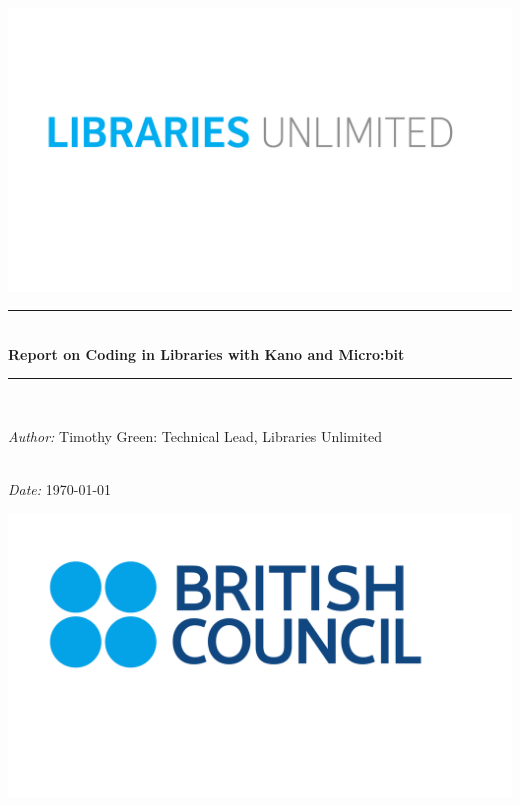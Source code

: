 \documentclass[12pt]{report} %
\begin{document}

\begin{titlepage}

\newcommand{\HRule}{\rule{\linewidth}{0.5mm}} %


\center %

\includegraphics[width=0.7\linewidth, left]{LU}\\[1cm] %
\vspace{1cm}


\HRule \\[0.5cm]
{ \huge \bfseries Report on Coding in Libraries with Kano and Micro:bit}\\[0.5cm] %
\HRule \\[0.5cm]
\vspace{7cm}
\begin{flushleft}
\begin{minipage}{0.9\textwidth}
\begin{flushleft} %
\emph{Author:} Timothy Green: Technical Lead, Libraries Unlimited %
\end{flushleft}
\end{minipage}\\[1cm]
\emph{Date:} {\large \today}\\[1.5cm]%
\end{flushleft}
\includegraphics[width=0.28\linewidth, left]{BC}\\ %


\end{titlepage}
\end{document}
